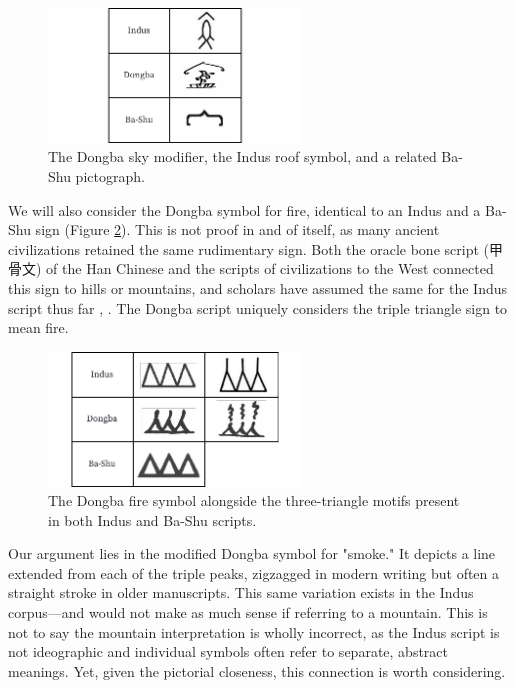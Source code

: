 \documentclass[11pt,a4paper,oneside]{report}
\begin{document}
\begin{figure}[H] 
    \centering
    \includegraphics[width=0.6\textwidth]{Visualizations/Figures/Sky.pdf}
    \caption[Indus vs. Dongba Sky Symbol Comparison Chart]{The Dongba sky modifier, the Indus roof symbol, and a related Ba-Shu pictograph.}
    \label{fig:sky}
\end{figure}

We will also consider the Dongba symbol for fire, identical to an Indus and a Ba-Shu sign (Figure \ref{fig:fire}). This is not proof in and of itself, as many ancient civilizations retained the same rudimentary sign. Both the oracle bone script (甲骨文) of the Han Chinese and the scripts of civilizations to the West connected this sign to hills or mountains, and scholars have assumed the same for the Indus script thus far \cite{parpola_deciphering_1994}, \cite{mahadevan_akam_2010}. The Dongba script uniquely considers the triple triangle sign to mean fire.

\begin{figure}[H] 
    \centering
    \includegraphics[width=0.6\textwidth]{Visualizations/Figures/Fire.pdf}
    \caption[Indus vs. Dongba Fire \& Smoke Comparison Chart]{The Dongba fire symbol alongside the three-triangle motifs present in both Indus and Ba-Shu scripts.}
    \label{fig:fire}
\end{figure}

Our argument lies in the modified Dongba symbol for "smoke." It depicts a line extended from each of the triple peaks, zigzagged in modern writing but often a straight stroke in older manuscripts. This same variation exists in the Indus corpus—and would not make as much sense if referring to a mountain. This is not to say the mountain interpretation is wholly incorrect, as the Indus script is not ideographic and individual symbols often refer to separate, abstract meanings. Yet, given the pictorial closeness, this connection is worth considering.
\end{document}
